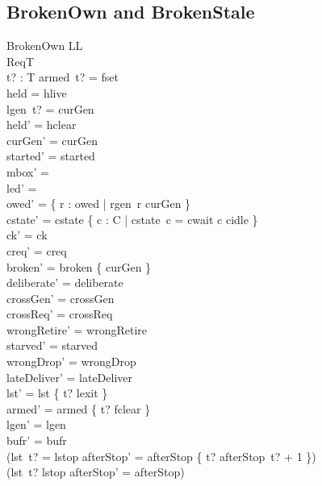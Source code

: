 \documentclass[a4paper,10pt,fleqn]{article}
\begin{document}
\subsection{BrokenOwn and BrokenStale}

\begin{schema}{BrokenOwn}
  \Delta LL \\
  \Xi ReqT \\
  t? : T
\where
  armed~t? = fset \\
  held = hlive \\
  lgen~t? = curGen \\
  held' = hclear \\
  curGen' = curGen \\
  started' = started \\
  mbox' = \emptyset \\
  led' = \emptyset \\
  owed' = \{ r : owed | rgen~r \neq curGen \} \\
  cstate' = cstate \oplus \{ c : C | cstate~c = cwait \spot c \mapsto cidle \} \\
  ck' = ck \\
  creq' = creq \\
  broken' = broken \cup \{ curGen \} \\
  deliberate' = deliberate \\
  crossGen' = crossGen \\
  crossReq' = crossReq \\
  wrongRetire' = wrongRetire \\
  starved' = starved \\
  wrongDrop' = wrongDrop \\
  lateDeliver' = lateDeliver \\
  lst' = lst \oplus \{ t? \mapsto lexit \} \\
  armed' = armed \oplus \{ t? \mapsto fclear \} \\
  lgen' = lgen \\
  bufr' = bufr \\
  (lst~t? = lstop \implies
    afterStop' = afterStop \oplus \{ t? \mapsto afterStop~t? + 1 \}) \\
  (lst~t? \neq lstop \implies afterStop' = afterStop)
\end{schema}
\end{document}
